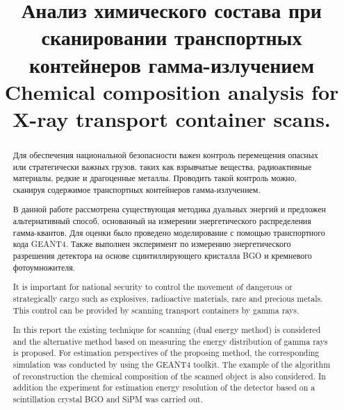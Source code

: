 \documentclass[a4paper]{panl}
\begin{document}
\title{Анализ химического состава при сканировании транспортных контейнеров гамма-излучением \\ Chemical composition analysis for X-ray transport container scans.}
\maketitle
{}
\vspace{-3mm}

\begin{abstract}
Для обеспечения национальной безопасности важен контроль перемещения опасных или стратегически важных грузов, таких как взрывчатые вещества, радиоактивные материалы, редкие и драгоценные металлы. Проводить такой контроль можно, сканируя содержимое транспортных контейнеров гамма-излучением.
 
В данной работе рассмотрена существующая методика дуальных энергий и предложен альтернативный способ, основанный на измерении энергетического распределения гамма-квантов. Для оценки было проведено моделирование с помощью транспортного кода GEANT4.  Также выполнен эксперимент по измерению энергетического разрешения детектора на основе сцинтиллирующего кристалла BGO и кремневого фотоумножителя.

\vspace{0.2cm}
It is important for national security to control the movement of dangerous or strategically cargo such as explosives, radioactive materials, rare and precious metals. This control can be provided by scanning transport containers by gamma rays.

In this report the existing technique for scanning (dual energy method) is considered and the alternative method based on measuring the energy distribution of gamma rays is proposed. For estimation perspectives of the proposing method, the  corresponding simulation was conducted by using the GEANT4 toolkit. The example of the algorithm of reconstruction the chemical composition of the scanned object is also considered. In addition the experiment for estimation energy resolution of the detector based on a scintillation crystal BGO and SiPM was carried out.\\
\end{abstract}
\vspace*{6pt}
\end{document}
